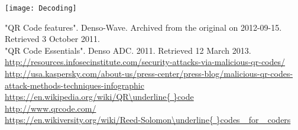 \documentclass[12pt,journal,compsoc]{IEEEtran}
\begin{document}
\begin{center}
\texttt{[image: Decoding]}
\end{center}


\begin{thebibliography}{1}

"QR Code features". Denso-Wave. Archived from the original on 2012-09-15. Retrieved 3 October 2011. \\

"QR Code Essentials". Denso ADC. 2011. Retrieved 12 March 2013. \\

 \url{http://resources.infosecinstitute.com/security-attacks-via-malicious-qr-codes/ } \\

 \url{http://usa.kaspersky.com/about-us/press-center/press-blog/malicious-qr-codes-attack-methods-techniques-infographic} \\

 \url{https://en.wikipedia.org/wiki/QR\underline{ }code} \\

 \url{http://www.qrcode.com/} \\

 \url{https://en.wikiversity.org/wiki/Reed-Solomon\underline{ }codes\_ for\_ coders}


\end{thebibliography}
\end{document}
